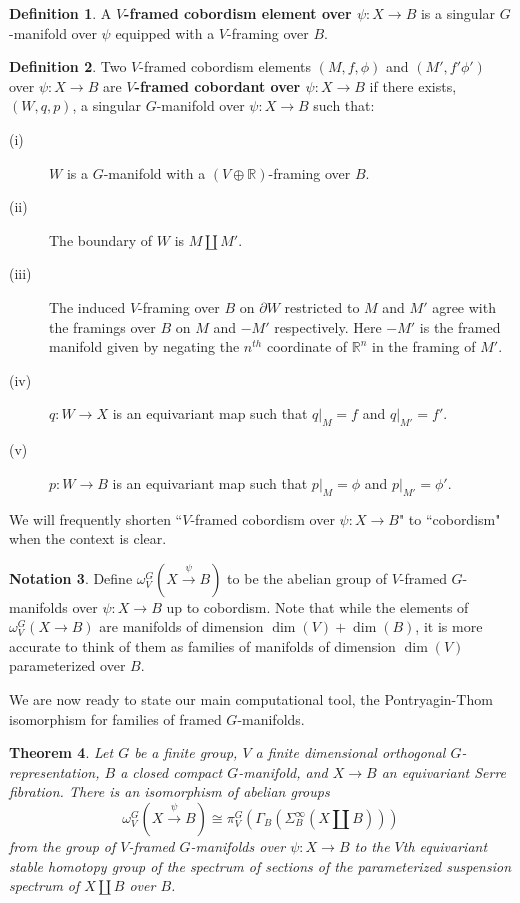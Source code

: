 \documentclass[11pt]{amsart}
\newcommand{\R}{\mathbb R}
\theoremstyle{plain}   %
\newtheorem{thm}{Theorem}[section] %
\theoremstyle{definition}
\newtheorem{df}[thm]{Definition}
\newtheorem{notn}[thm]{Notation}
\theoremstyle{remark}
\numberwithin{equation}{section}
\begin{document}
\begin{df}
A \textbf{$V$-framed cobordism element over $\psi:X\to B$} is a singular $G$-manifold over $\psi$ equipped with a $V$-framing over $B$. 
\end{df}

\begin{df}
Two $V$-framed cobordism elements $(M,f,\phi)$ and $(M',f'\phi')$ over $\psi\colon X\to B$ are \textbf{$V$-framed cobordant over $\psi\colon X\to B$} if there exists, $(W,q,p)$, a singular $G$-manifold over $\psi\colon X\to B$ such that:
\begin{description}
\item[(i)] $W$ is a $G$-manifold with a $(V\oplus \R)$-framing over $B$.
\item[(ii)] The boundary of $W$ is $M\amalg M'$. 
\item[(iii)] The induced $V$-framing over $B$ on $\partial W$ restricted to $M$ and $M'$ agree with the framings over $B$ on $M$ and $-M'$ respectively. Here $-M'$ is the framed manifold given by negating the $n^{th}$ coordinate of $\R^n$ in the framing of $M'$. 
\item[(iv)] $q\colon W\to X$ is an equivariant map such that $q|_{M}=f$ and $q|_{M'}=f'$. 
\item[(v)] $p\colon W\to B$ is an equivariant map such that $p|_M=\phi$ and $p|_{M'}=\phi'$.  
\end{description}
We will frequently shorten ``$V$-framed cobordism over $\psi\colon X\to B$" to ``cobordism" when the context is clear.
\end{df}

\begin{notn}
Define $\omega_{V}^G(X\xrightarrow{\psi} B)$ to be the abelian group of $V$-framed $G$-manifolds over $\psi\colon X\to B$ up to cobordism. Note that while the elements of $\omega_{V}^G(X\to B)$ are manifolds of dimension $\dim(V)+\dim(B)$, it is more accurate to think of them as families of manifolds of dimension $\dim(V)$ parameterized over $B$.
\end{notn}

We are now ready to state our main computational tool, the Pontryagin-Thom isomorphism for families of framed $G$-manifolds.

\begin{thm}\cite[Theorem 1.2]{williams_framed_PT}\label{thm:equivariant parameterized PT}
Let $G$ be a finite group, $V$ a finite dimensional orthogonal $G$-representation, $B$ a closed compact $G$-manifold, and $X \to B$ an equivariant Serre fibration. There is an isomorphism of abelian groups
\[
\omega_{V}^G(X\xrightarrow{\psi} B) \cong \pi_V^G\left( \Gamma_B(\Sigma_B^\infty (X\amalg B)) \right)
\]
from the group of $V$-framed $G$-manifolds over $\psi\colon X\to B$ to the $V$th equivariant stable homotopy group of the spectrum of sections of the parameterized suspension spectrum of $X\amalg B$ over $B$. 
\end{thm}
\end{document}
